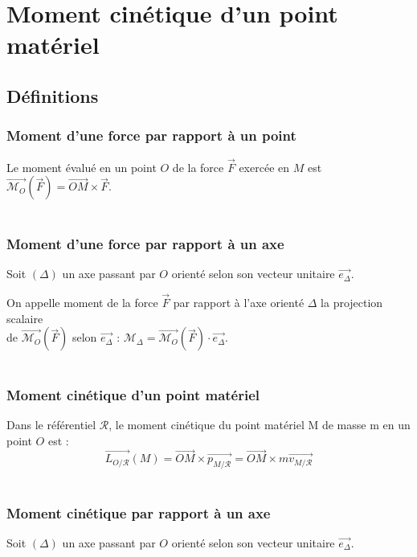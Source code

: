 \documentclass[a4paper,10pt]{book} %
\begin{document}


\chapter{Moment cinétique d'un point matériel}
\section{Définitions}
\subsection{Moment d'une force par rapport à un point}
Le moment évalué en un point $O$ de la force $\overrightarrow{F}$ exercée en $M$ est $\overrightarrow{\mathcal{M}_O}(\overrightarrow{F})=\overrightarrow{OM}\times \overrightarrow{F}$.\\\\

\subsection{Moment d'une force par rapport à un axe}
Soit $(\Delta)$ un axe passant par $O$ orienté selon son vecteur unitaire $\overrightarrow{e_{\Delta}}$.

On appelle moment de la force $\overrightarrow{F}$ par rapport à l'axe orienté $\Delta$ la projection scalaire\\
de $\overrightarrow{\mathcal{M}_O}(\overrightarrow{F})$ selon $\overrightarrow{e_\Delta}$ : $\mathcal{M}_{\Delta}=\overrightarrow{\mathcal{M}_O}(\overrightarrow{F})\cdot \overrightarrow{e_\Delta}$.\\\\

\subsection{Moment cinétique d'un point matériel}
Dans le référentiel $\mathcal{R}$, le moment cinétique du point matériel M de masse m en un point $O$ est :
$$\overrightarrow{L_{O/\mathcal{R}}}(M)=\overrightarrow{OM}\times \overrightarrow{p_{M/\mathcal{R}}} =\overrightarrow{OM}\times m\overrightarrow{v_{M/\mathcal{R}}}$$\\

\subsection{Moment cinétique par rapport à un axe}
Soit $(\Delta)$ un axe passant par $O$ orienté selon son vecteur unitaire $\overrightarrow{e_{\Delta}}$.\\
\end{document}
